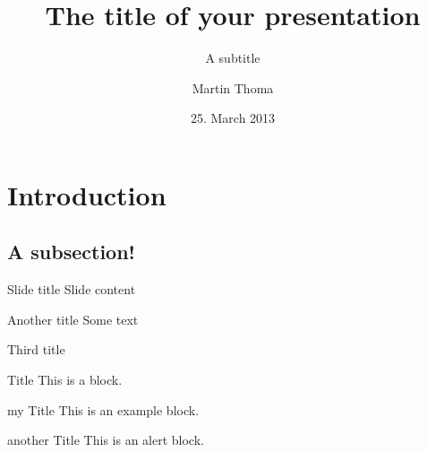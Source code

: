 \documentclass{beamer}
\begin{document}
\title{The title of your presentation}
\subtitle{A subtitle}
\author{Martin Thoma}
\date{25. March 2013}
\subject{Computer Science}

\frame{\titlepage}



\section{Introduction}
\subsection{A subsection!}
\begin{frame}{Slide title}
    Slide content
\end{frame}

\begin{frame}{Another title}
    Some text\\
\end{frame}

\begin{frame}{Third title}
    \begin{block}{Title}
        This is a block.
    \end{block}

    \begin{exampleblock}{my Title}
        This is an example block.
    \end{exampleblock}

    \begin{alertblock}{another Title}
        This is an alert block.
    \end{alertblock}
\end{frame}
\end{document}
